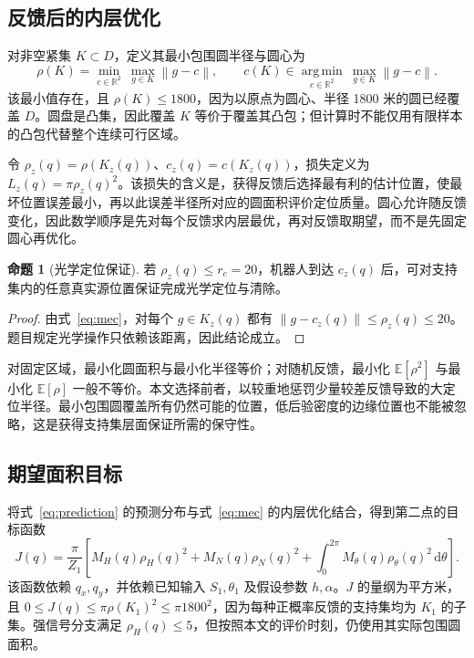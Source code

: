 \documentclass[UTF8,a4paper,zihao=-4,fontset=none]{ctexart}
\numberwithin{equation}{section}
\theoremstyle{definition}
\newtheorem{proposition}{命题}[section]
\newcommand{\R}{\mathbb R}
\newcommand{\E}{\mathbb E}
\newcommand{\dd}{\,\mathrm d}
\newcommand{\norm}[1]{\left\lVert #1\right\rVert}
\newcommand{\argmin}{\operatorname*{arg\,min}}
\begin{document}
\subsection{反馈后的内层优化}
对非空紧集 \(K\subset D\)，定义其最小包围圆半径与圆心为
\begin{equation}\label{eq:mec}
\rho(K)=\min_{c\in\R^2}\ \max_{g\in K}\norm{g-c},
\qquad
c(K)\in\argmin_{c\in\R^2}\ \max_{g\in K}\norm{g-c}.
\end{equation}
该最小值存在，且 \(\rho(K)\le1800\)，因为以原点为圆心、半径 1800 米的圆已经覆盖 \(D\)。圆盘是凸集，因此覆盖 \(K\) 等价于覆盖其凸包；但计算时不能仅用有限样本的凸包代替整个连续可行区域。

令 \(\rho_z(q)=\rho(K_z(q))\)、\(c_z(q)=c(K_z(q))\)，损失定义为 \(L_z(q)=\pi\rho_z(q)^2\)。该损失的含义是，获得反馈后选择最有利的估计位置，使最坏位置误差最小，再以此误差半径所对应的圆面积评价定位质量。圆心允许随反馈变化，因此数学顺序是先对每个反馈求内层最优，再对反馈取期望，而不是先固定圆心再优化。

\begin{proposition}[光学定位保证]
若 \(\rho_z(q)\le r_c=20\)，机器人到达 \(c_z(q)\) 后，可对支持集内的任意真实源位置保证完成光学定位与清除。
\end{proposition}
\begin{proof}
由式~\eqref{eq:mec}，对每个 \(g\in K_z(q)\) 都有 \(\norm{g-c_z(q)}\le\rho_z(q)\le20\)。题目规定光学操作只依赖该距离，因此结论成立。
\end{proof}

对固定区域，最小化圆面积与最小化半径等价；对随机反馈，最小化 \(\E[\rho^2]\) 与最小化 \(\E[\rho]\) 一般不等价。本文选择前者，以较重地惩罚少量较差反馈导致的大定位半径。最小包围圆覆盖所有仍然可能的位置，低后验密度的边缘位置也不能被忽略，这是获得支持集层面保证所需的保守性。

\subsection{期望面积目标}
将式~\eqref{eq:prediction} 的预测分布与式~\eqref{eq:mec} 的内层优化结合，得到第二点的目标函数
\begin{equation}\label{eq:objective}
\boxed{\displaystyle
J(q)=\frac{\pi}{Z_1}\left[
M_H(q)\rho_H(q)^2+M_N(q)\rho_N(q)^2
+\int_0^{2\pi}M_\theta(q)\rho_\theta(q)^2\dd\theta
\right].}
\end{equation}
该函数依赖 \(q_x,q_y\)，并依赖已知输入 \(S_1,\theta_1\) 及假设参数 \(h,\alpha\)。\(J\) 的量纲为平方米，且 \(0\le J(q)\le\pi\rho(K_1)^2\le\pi1800^2\)，因为每种正概率反馈的支持集均为 \(K_1\) 的子集。强信号分支满足 \(\rho_H(q)\le5\)，但按照本文的评价时刻，仍使用其实际包围圆面积。
\end{document}
